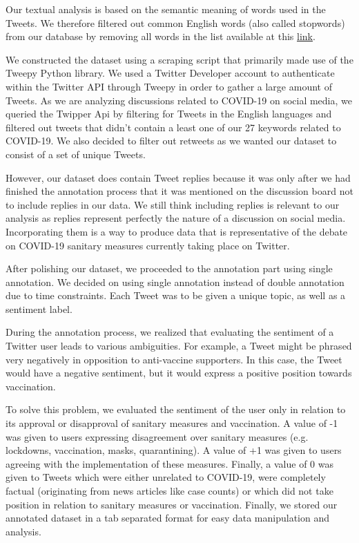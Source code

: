 \documentclass[letterpaper]{article} %
\begin{document}


Our textual analysis is based on the semantic meaning of words used in the Tweets. We therefore filtered out common English words (also called stopwords) from our database by removing all words in the list available at this \href{https://github.com/igorbrigadir/stopwords/blob/master/en/onix.txt}{link}. 


We constructed the dataset using a scraping script that primarily made use of the Tweepy Python library. We used a Twitter Developer account to authenticate within the Twitter API through Tweepy in order to gather a large amount of Tweets. As we are analyzing discussions related to COVID-19 on social media, we queried the Twipper Api by filtering for Tweets in the English languages and filtered out tweets that didn't contain a least one of our 27 keywords related to COVID-19. We also decided to filter out retweets as we wanted our dataset to consist of a set of unique Tweets. 

However, our dataset does contain Tweet replies because it was only after we had finished the annotation process that it was mentioned on the discussion board not to include replies in our data. We still think including replies is relevant to our analysis as replies represent perfectly the nature of a discussion on social media. Incorporating them is a way to produce data that is representative of the debate on COVID-19 sanitary measures currently taking place on Twitter.  

After polishing our dataset, we proceeded to the annotation part using single annotation. We decided on using single annotation instead of double annotation due to time constraints. Each Tweet was to be given a unique topic, as well as a sentiment label.

During the annotation process, we realized that evaluating the sentiment of a Twitter user leads to various ambiguities. For example, a Tweet might be phrased very negatively in opposition to anti-vaccine supporters. In this case, the Tweet would have a negative sentiment, but it would express a positive position towards vaccination. 

To solve this problem, we evaluated the sentiment of the user only in relation to its approval or disapproval of sanitary measures and vaccination. A value of -1 was given to users expressing disagreement over sanitary measures (e.g. lockdowns, vaccination, masks, quarantining). A value of +1 was given to users agreeing with the implementation of these measures. Finally, a value of 0 was given to Tweets which were either unrelated to COVID-19, were completely factual (originating from news articles like case counts) or which did not take position in relation to sanitary measures or vaccination. Finally, we stored our annotated dataset in a tab separated format for easy data manipulation and analysis. 
\end{document}
